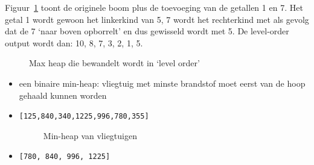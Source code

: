 \begin{Oplossing}{6.4}
Figuur~\ref{fig:levelorderheap} toont de originele boom plus de toevoeging van de getallen 1 en 7. Het getal 1 wordt gewoon het linkerkind van 5, 7 wordt het rechterkind met als gevolg dat de 7 ‘naar boven opborrelt’ en dus gewisseld wordt met 5. De level-order output wordt dan: 10, 8, 7, 3, 2, 1, 5.
\begin{figure}[htbp]
    \centering
{}
\caption{Max heap die bewandelt wordt in ‘level order’}
\label{fig:levelorderheap}
\end{figure}
\end{Oplossing}
\begin{Oplossing}{6.5}
\begin{itemize}
\item een binaire min-heap: vliegtuig met minste brandstof moet eerst van de hoop gehaald kunnen worden
\item \verb/[125,840,340,1225,996,780,355]/

\begin{figure}[htbp]
    \centering
{}
\caption{Min-heap van vliegtuigen}
\end{figure}
\item \verb/[780, 840, 996, 1225]/
\end{itemize}
\end{Oplossing}
